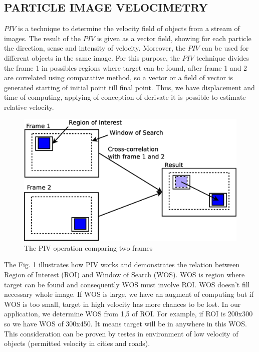 
\subsection{PARTICLE IMAGE VELOCIMETRY}

$PIV$ is a technique to determine the  velocity field of objects from a stream of images\cite{Bastiaans}.
The result of the $PIV$ is given as a vector field, showing for each particle the direction, sense and intensity of velocity. 
Moreover, the $PIV$ can be used for different objects in the same image.
For this purpose, the $PIV$ technique divides the frame 1 in possibles regions where target can be found, 
after frame 1 and 2 are correlated using comparative method, so a vector or a field of vector is generated 
starting of initial point till final point. Thus, we have displacement and time of computing, applying of 
conception of derivate it is possible to estimate relative velocity.

\begin{figure}[H]
\includegraphics[width=\columnwidth]{images/explanationPIV.eps}
\caption{The PIV operation comparing two frames}
\label{fig:twoframes}
\end{figure}

The Fig. \ref{fig:twoframes} illustrates how PIV works and demonstrates the relation between Region of Interest (ROI) and 
Window of Search (WOS). WOS is region where target can be found and consequently WOS must involve ROI. 
WOS doesn't fill necessary whole image. If WOS is large, we have an augment of computing but 
if WOS is too small, target in high velocity has more chances to be lost. In our application, 
we determine WOS from 1,5 of ROI. For example, if ROI is 200x300 so we have WOS of 300x450. 
It means target will be in anywhere in this WOS. This consideration can be
proven by testes in environment of low velocity of objects (permitted velocity in cities and roads).

